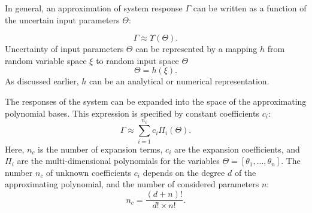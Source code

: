 In general, an approximation of system response $\Gamma$ can be written as a
function of the uncertain input parameters $\Theta$:

\begin{equation}
  \Gamma\approx\Upsilon(\Theta).
  \label{eq:1}
\end{equation} 
%
Uncertainty of input parameters $\Theta$ can be represented by a mapping $h$ from
random variable space $\xi$ to random input space $\Theta$%
\begin{equation}
  \Theta=h(\xi).
  \label{eq:rand}
\end{equation} As discussed earlier, $h$ can be an analytical or numerical
representation.



The responses of the system can be expanded into the
space of the approximating polynomial bases. This expression is specified by constant coefficients $c_i$:
%
\begin{equation}
\Gamma\approx\underset{i=1}{\overset{n_c}{\sum}}c_{i}\Pi_{i}(\Theta).
  \label{eq:exp}
\end{equation} Here, $n_c$ is the number of expansion terms, $c_{i}$ are the
expansion coefficients, and
$\Pi_{i}$ are the multi-dimensional polynomials for the variables
$\Theta=[\theta_{1},...,\theta_{n}]$. The number $n_c$ of unknown
coefficients $c_{i}$ depends on the degree $d$ of the approximating polynomial,
and the number of considered parameters $n$:
%
\begin{equation}
 n_c=\frac{(d+n)!}{d!\times n!}.
 \label{eq:np}
\end{equation}
%

